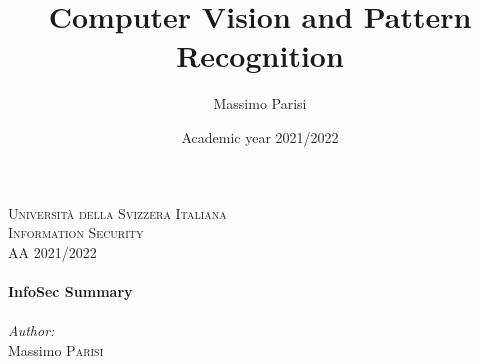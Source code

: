 \documentclass[12pt]{article}
\title{Computer Vision and Pattern Recognition}
\author{Massimo Parisi}
\date{Academic year 2021/2022}
\begin{document}

{\center %
 

\textsc{\LARGE Università della Svizzera Italiana}\\[1.5cm] %
\textsc{\Large Information Security}\\[0.5cm] %
\textsc{\large AA 2021/2022}\\[0.5cm] %


\HRule \\[0.4cm]
{ \huge \bfseries InfoSec Summary}\\[0.4cm] %
\HRule \\[1.5cm]
 

\Large \emph{Author:}\\
Massimo \textsc{Parisi}\\[1.5cm] %


}
\end{document}
